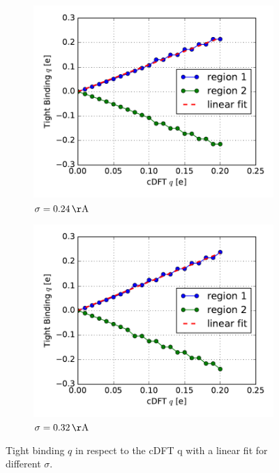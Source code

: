 \begin{figure}
	\centering
	\begin{subfigure}{0.49\textwidth}
		\centering
		\includegraphics[width = \textwidth]{Images/Hydrogen/charging/qs_normal_sigma}
		\caption{$\sigma = \unit[0.24]{\AA}$}
		\label{}
	\end{subfigure}\hspace*{.5cm}
	\begin{subfigure}{0.49\textwidth}
		\centering
		\includegraphics[width = \textwidth]{Images/Hydrogen/charging/qs_other_sigma}
		\caption{$\sigma = \unit[0.32]{\AA}$}
		\label{}
	\end{subfigure}
	\caption{Tight binding $q$ in respect to the cDFT q with a linear fit for different $\sigma$.}
	\label{image_qs_hydrogen}
\end{figure}
